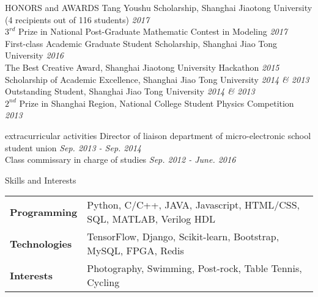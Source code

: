\documentclass{resume_ucla} %
\begin{document}
\begin{rSection}{HONORS and AWARDS}
Tang Youshu Scholarship, Shanghai Jiaotong University (4 recipients out of 116 students) \hfill \emph{2017}
\\$3^{rd}$ Prize in National Post-Graduate Mathematic Contest in Modeling \hfill \emph{2017}
\\First-class Academic Graduate Student Scholarship, Shanghai Jiao Tong University  \hfill \emph{2016}
\\The Best Creative Award, Shanghai Jiaotong University Hackathon \hfill \emph{2015}
\\Scholarship of Academic Excellence, Shanghai Jiao Tong University \hfill \emph{2014 \& 2013}
\\Outstanding Student, Shanghai Jiao Tong University \hfill \emph{2014 \& 2013}
\\$2^{nd}$ Prize in Shanghai Region, National College Student Physics Competition \hfill \emph{2013}
\end{rSection}

\begin{rSection}{extracurricular activities}
Director of liaison department of micro-electronic school student union \hfill \emph{Sep. 2013 - Sep. 2014}
\\Class commissary in charge of studies  \hfill \emph{Sep. 2012 - June. 2016}
\end{rSection}

\begin{rSection}{Skills and Interests}
\begin{tabular}{ll}
\textbf{Programming \quad} & Python, C/C++, JAVA, Javascript, HTML/CSS, SQL, MATLAB, Verilog HDL\\
\textbf{Technologies} & TensorFlow, Django, Scikit-learn, Bootstrap, MySQL, FPGA, Redis\\
\textbf{Interests} & Photography, Swimming, Post-rock, Table Tennis, Cycling\\
\end{tabular}
\end{rSection}




\end{document}
